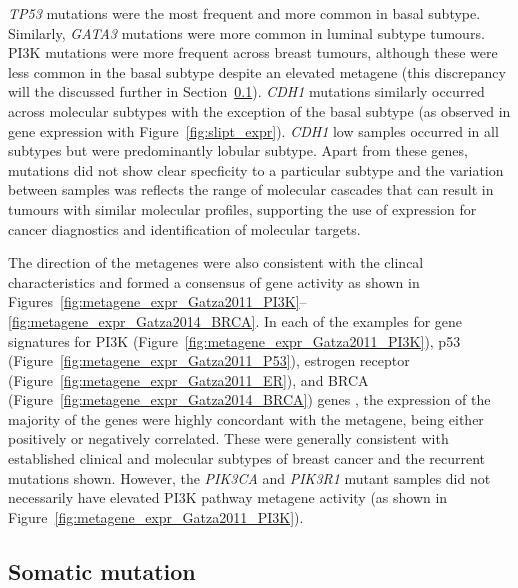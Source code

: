 \textit{TP53} mutations were the most frequent and more common in basal subtype. Similarly, \textit{GATA3} mutations were more common in luminal subtype tumours. PI3K mutations were more frequent across breast tumours, although these were less common in the basal subtype despite an elevated metagene (this discrepancy will the discussed further in Section~\ref{chapt3:metagene_mut}). \textit{CDH1} mutations similarly occurred across molecular subtypes with the exception of the basal subtype (as observed in gene expression with Figure~\ref{fig:slipt_expr}). \textit{CDH1} low samples occurred in all subtypes but were predominantly lobular subtype. Apart from these genes, mutations did not show clear specficity to a particular subtype and the variation between samples was reflects the range of molecular cascades that can result in tumours with similar molecular profiles, supporting the use of expression for cancer diagnostics and identification of molecular targets. 

The direction of the metagenes were also consistent with the clincal characteristics and formed a consensus of gene activity as shown in Figures~\ref{fig:metagene_expr_Gatza2011_PI3K}\nobreakdash--\ref{fig:metagene_expr_Gatza2014_BRCA}. In each of the examples for gene signatures for PI3K (Figure~\ref{fig:metagene_expr_Gatza2011_PI3K}), p53 (Figure~\ref{fig:metagene_expr_Gatza2011_P53}), estrogen receptor (Figure~\ref{fig:metagene_expr_Gatza2011_ER}), and BRCA (Figure~\ref{fig:metagene_expr_Gatza2014_BRCA}) genes \citep{Gatza2011, Gatza2014}, the expression of the majority of the genes were highly concordant with the metagene, being either positively or negatively correlated. These were generally consistent with established clinical and molecular subtypes of breast cancer and the recurrent mutations shown. However, the \textit{PIK3CA} and \textit{PIK3R1} mutant samples did not necessarily have elevated PI3K pathway metagene activity (as shown in Figure~\ref{fig:metagene_expr_Gatza2011_PI3K}).  

\FloatBarrier

\subsection{Somatic mutation}  \label{chapt3:metagene_mut}

